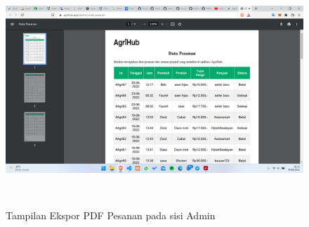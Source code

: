 \begin{enumerate}
\begin{enumerate}[a.]
\begin{figure}[H]
			\label{detail_pesanan}
		\end{figure}
		\begin{figure}[H]
			\centering
			{\includegraphics [width = 13.5cm, height= 8cm]{gambar/admin/export_pesanan_admin}}
			\caption{Tampilan Ekspor PDF Pesanan pada sisi Admin}
			\label{export_pesanan_admin}
		\end{figure}


\end{enumerate}
\end{enumerate}

